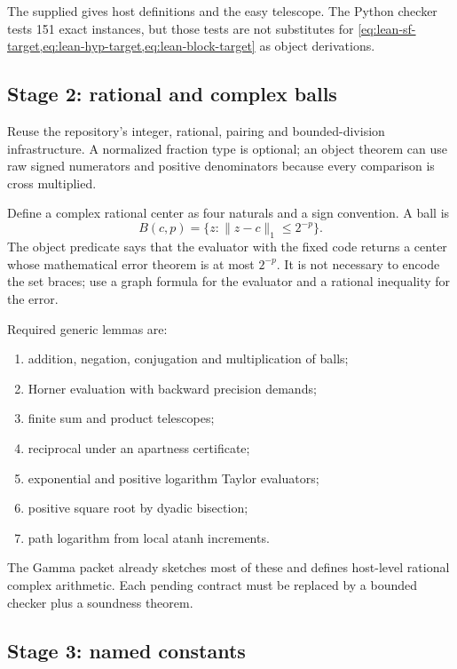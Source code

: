 The supplied  gives host definitions and the easy
telescope.  The Python checker tests 151 exact instances, but those tests are
not substitutes for \cref{eq:lean-sf-target,eq:lean-hyp-target,eq:lean-block-target}
as object derivations.

\subsection{Stage 2: rational and complex balls}

Reuse the repository's integer, rational, pairing and bounded-division
infrastructure.  A normalized fraction type is optional; an object theorem can
use raw signed numerators and positive denominators because every comparison is
cross multiplied.

Define a complex rational center as four naturals and a sign convention.  A
ball is
\[
 B(c,p)=\{z:\|z-c\|_1\le2^{-p}\}.
\]
The object predicate  says that the evaluator with
the fixed code returns a center whose mathematical error theorem is at most
\(2^{-p}\).  It is not necessary to encode the set braces; use a graph formula
for the evaluator and a rational inequality for the error.

Required generic lemmas are:
\begin{enumerate}
\item addition, negation, conjugation and multiplication of balls;
\item Horner evaluation with backward precision demands;
\item finite sum and product telescopes;
\item reciprocal under an apartness certificate;
\item exponential and positive logarithm Taylor evaluators;
\item positive square root by dyadic bisection;
\item path logarithm from local atanh increments.
\end{enumerate}
The Gamma packet already sketches most of these and defines host-level rational
complex arithmetic.  Each pending contract must be replaced by a bounded
checker plus a  soundness theorem.

\subsection{Stage 3: named constants}

